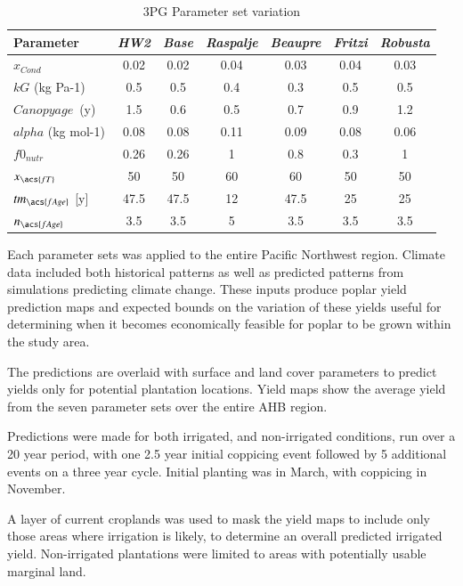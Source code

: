 \documentclass[preprint,12pt]{elsarticle}
\begin{document}
\begin{table}%
\caption{3PG Parameter set variation}
\begin{tabularx}{\linewidth}{|Xcccccc|}
\hline
 Parameter & \emph{HW2} & \emph{Base} & \emph{Raspalje} & \emph{Beaupre} & \emph{Fritzi} & \emph{Robusta}\\
  \hline   
  $x_{Cond}$  & 0.02 & 0.02 & 0.04 & 0.03 & 0.04 & 0.03 \\
  $kG$ (kg Pa-1) & 0.5 & 0.5 & 0.4 & 0.3 & 0.5 & 0.5 \\
  $Canopy age$~(y) & 1.5 & 0.6 & 0.5 & 0.7 & 0.9 & 1.2 \\
  $alpha$ (kg mol-1) & 0.08 & 0.08 & 0.11 & 0.09 & 0.08 & 0.06 \\
  $f0_{nutr}$  & 0.26 & 0.26 & 1 & 0.8 & 0.3 & 1 \\
  $x_{\acs{fT}}$ & 50 & 50 & 60 & 60 & 50 & 50 \\
  $tm_{\acs{fAge}}$ [y] & 47.5 & 47.5 & 12 & 47.5 & 25  & 25 \\
  $n_{\acs{fAge}}$ & 3.5 & 3.5 & 5 & 3.5 & 3.5 & 3.5 \\
  \hline
\end{tabularx}
\label{tab:3pg-tree-parameters-vary}
\end{table}

Each parameter sets was applied to the entire Pacific Northwest
region.  Climate data included both historical patterns as well as
predicted patterns from simulations predicting climate change.  These
inputs produce poplar yield prediction maps and expected bounds on the
variation of these yields useful for determining when it becomes
economically feasible for poplar to be grown within the study area.

The predictions are overlaid with surface and land cover parameters to
predict yields only for potential plantation locations.  Yield maps
show the average yield from the seven parameter sets over the entire
\ac{AHB} region.

Predictions were made for both irrigated, and non-irrigated
conditions, run over a 20 year period, with one 2.5 year initial
coppicing event followed by 5 additional events on a three year cycle.
Initial planting was in March, with coppicing in November.

A layer of current croplands was used to mask the yield maps to
include only those areas where irrigation is likely, to determine an
overall predicted irrigated yield.  Non-irrigated plantations were
limited to areas with potentially usable marginal land.
\end{document}
